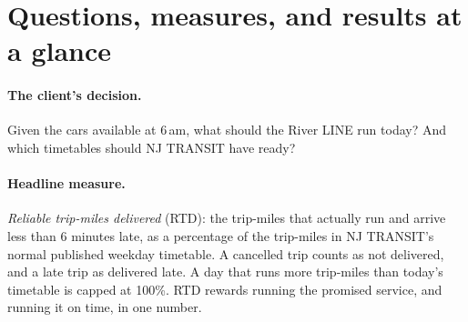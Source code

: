 \documentclass[11pt]{article}
\begin{document}
\begin{abstract}
\textbf{Revision 4} combines the fleet and delay simulations into one headline measure: on-time trip-miles delivered, as a share of today's timetable. It recalibrates the inputs to NJ TRANSIT and NTD data and tests the model against 2024--26 evidence (Section~\ref{sec:combined}). With the calibrated inputs, the fleet's reliability matters most: from the 2024--25 Alstom era to 2026 under NJ TRANSIT, the measure rises from 69\% to 84\%. Among schedule choices, the robust timetable B8 matters most, adding 3--4 points in every scenario at no extra cost. Choosing the day's timetable from the 6\,am car count adds about 1 point in the 2024--25 conditions and nothing at 2026 reliability. The earlier T8--T3 tiers score below today's timetable on this measure.
\end{abstract}

\tableofcontents
\newpage


\section{Questions, measures, and results at a glance}\label{sec:glance}
\paragraph{The client's decision.} Given the cars available at 6\,am, what should the River LINE run today? And which timetables should NJ TRANSIT have ready?

\paragraph{Headline measure.} \emph{Reliable trip-miles delivered} (RTD): the trip-miles that actually run and arrive less than 6 minutes late, as a percentage of the trip-miles in NJ TRANSIT's normal published weekday timetable. A cancelled trip counts as not delivered, and a late trip as delivered late. A day that runs more trip-miles than today's timetable is capped at 100\%. RTD rewards running the promised service, and running it on time, in one number.
\end{document}
